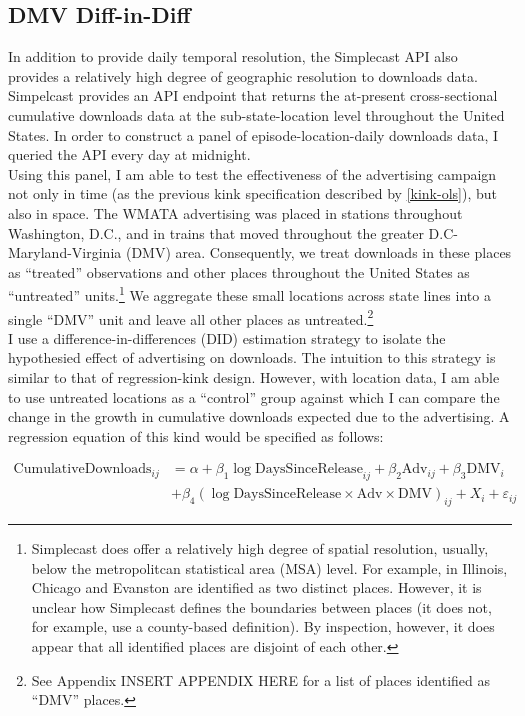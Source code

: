 \documentclass[11pt, letterpaper, twoside]{article}
\begin{document}
\subsection{DMV Diff-in-Diff}
In addition to provide daily temporal resolution, the Simplecast API also provides a relatively high degree of geographic resolution to downloads data. Simpelcast provides an API endpoint that returns the at-present cross-sectional cumulative downloads data at the sub-state-location level throughout the United States. In order to construct a panel of episode-location-daily downloads data, I queried the API every day at midnight.\\

Using this panel, I am able to test the effectiveness of the advertising campaign not only in time (as the previous kink specification described by \eqref{kink-ols}), but also in space. The WMATA advertising was placed in stations throughout Washington, D.C., and in trains that moved throughout the greater D.C-Maryland-Virginia (DMV) area. Consequently, we treat downloads in these places as ``treated'' observations and other places throughout the United States as ``untreated'' units.\footnote{Simplecast does offer a relatively high degree of spatial resolution, usually, below the metropolitcan statistical area (MSA) level. For example, in Illinois, Chicago and Evanston are identified as two distinct places. However, it is unclear how Simplecast defines the boundaries between places (it does not, for example, use a county-based definition). By inspection, however, it does appear that all identified places are disjoint of each other.} We aggregate these small locations across state lines into a single ``DMV'' unit and leave all other places as untreated.\footnote{See Appendix INSERT APPENDIX HERE for a list of places identified as ``DMV'' places.}\\

I use a difference-in-differences (DID) estimation strategy to isolate the hypothesied effect of advertising on downloads. The intuition to this strategy is similar to that of regression-kink design. However, with location data, I am able to use untreated locations as a ``control'' group against which I can compare the change in the growth in cumulative downloads expected due to the advertising. A regression equation of this kind would be specified as follows:

\begin{align}
  \label{dmv-did}
  \text{CumulativeDownloads}_{ij} &= \alpha + \beta_1 \log \text{DaysSinceRelease}_{ij} + \beta_2 \text{Adv}_{ij} + \beta_3 \text{DMV}_i \\ \nonumber
    &+ \beta_4(\log \text{DaysSinceRelease} \times \text{Adv} \times \text{DMV})_{ij} + X_i + \varepsilon_{ij} 
\end{align}
\end{document}
